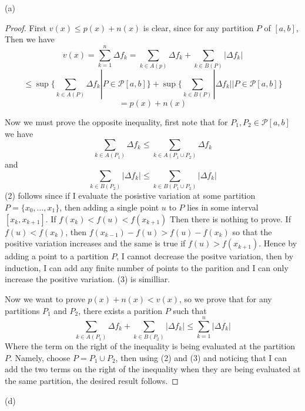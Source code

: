 \documentclass[11pt,largemargins]{homework}
\begin{document}
\begin{alphaparts} 
\questionpart 
(a) 

\begin{proof} 
	First $v(x) \leq p(x) + n(x)$ is clear, since for any partition $P$ of $[a,b]$, Then we have 
	\[ v(x) = \sum_{k=1}^n \Delta f_k = \sum_{k \in A(p)} \Delta f_k + \sum_{k \in B(P)}| \Delta f_k |\] 
	\[ \leq \sup \{\sum_{k \in A(P)} \Delta f_k | P \in \mathcal{P}[a, b] \} +\sup \{\sum_{k \in B(P)}| \Delta f_k| | P \in \mathcal{P}[a, b] \} \]
	\[= p(x) + n(x) \]

	Now we must prove the opposite inequality, first note that for $P_1, P_2 \in \mathcal{P}[a, b]$ we have 
	\begin{equation} \sum_{k \in A(P_1)} \Delta f_k \leq \sum_{k \in A(P_1 \cup P_2)} \Delta f_k \end{equation} 
	and 
	\begin{equation} \sum_{k \in B(P_2)} |\Delta f_k| \leq \sum_{k \in B(P_1 \cup P_2)} |\Delta f_k| \end{equation} 
	(2) follows since if I evaluate the posistive variation at some partition $P = \{x_0, \dots, x_1 \}$, then adding a single point $u$ to $P$
	lies in some interval $[x_k, x_{k+1}]$. If $f(x_k) < f(u) < f(x_{k+1})$ Then there is nothing to prove. If $f(u) < f(x_k)$, 
	then $f(x_{k-1}) - f(u) > f(u) - f(x_k)$ so that the positive variation increases and the same is true if $f(u) > f(x_{k+1})$. 
	Hence by adding a point to a partition $P$, I cannot decrease the positve variation, then by induction, I can add any finite number of points to the 
	parition and I can only increase the positive variation. (3) is similliar. 
	
	Now we want to prove $p(x) + n(x) < v(x)$, so we prove that for any partitions $P_1$ and $P_2$, there exists a parition $P$ such that 
	\begin{equation} \sum_{k \in A(P_1)} \Delta f_k + \sum_{k \in B(P_2)} |\Delta f_k | \leq \sum_{k = 1}^n |\Delta f_k | \end{equation}  
        Where the term on the right of the inequality is being evaluated at the partition $P$.	Namely, choose $P= P_1 \cup P_2$, then using (2) and (3) and
	noticing that I can add the two terms on the right of the inequality when they are being evaluated at the same partition, the desired result follows. 
\end{proof} 

\questionpart 
(d) 


\end{alphaparts}
\end{document}
